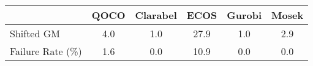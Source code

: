 \begin{tabular}{lccccc}
  \hline
   & \textbf{QOCO} & \textbf{Clarabel} & \textbf{ECOS} & \textbf{Gurobi} & \textbf{Mosek} \\ \hline
  Shifted GM & 4.0 & 1.0 & 27.9 & 1.0 & 2.9 \\ 
  Failure Rate (\%) & 1.6 & 0.0 & 10.9 & 0.0 & 0.0 \\ \hline 
\end{tabular}
